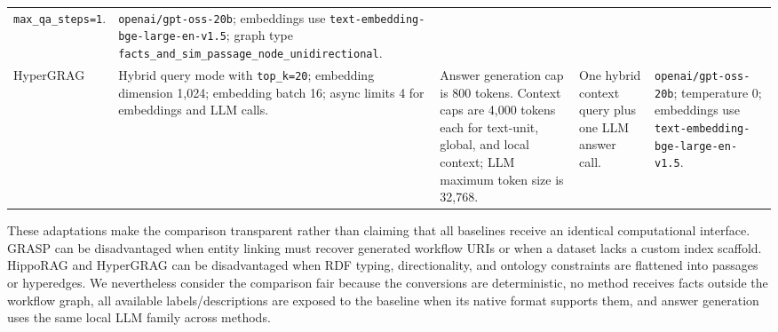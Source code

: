 \begin{table}[t]
\begin{tabular}{@{}p{}p{}p{}p{}p{}@{}}
\texttt{max\_qa\_steps=1}. &
\texttt{openai/gpt-oss-20b}; embeddings use \texttt{text-embedding-bge-large-en-v1.5}; graph type \texttt{facts\_and\_sim\_passage\_node\_unidirectional}. \\
\addlinespace
HyperGRAG &
Hybrid query mode with \texttt{top\_k=20}; embedding dimension 1,024; embedding batch 16; async limits 4 for embeddings and LLM calls. &
Answer generation cap is 800 tokens. Context caps are 4,000 tokens each for text-unit, global, and local context; LLM maximum token size is 32,768. &
One hybrid context query plus one LLM answer call. &
\texttt{openai/gpt-oss-20b}; temperature 0; embeddings use \texttt{text-embedding-bge-large-en-v1.5}. \\
\bottomrule
\end{tabular}
\end{table}

These adaptations make the comparison transparent rather than claiming that all
baselines receive an identical computational interface. GRASP can be
disadvantaged when entity linking must recover generated workflow URIs or when
a dataset lacks a custom index scaffold. HippoRAG and HyperGRAG can be
disadvantaged when RDF typing, directionality, and ontology constraints are
flattened into passages or hyperedges. We nevertheless consider the comparison
fair because the conversions are deterministic, no method receives facts
outside the workflow graph, all available labels/descriptions are exposed to
the baseline when its native format supports them, and answer generation uses
the same local LLM family across methods.
